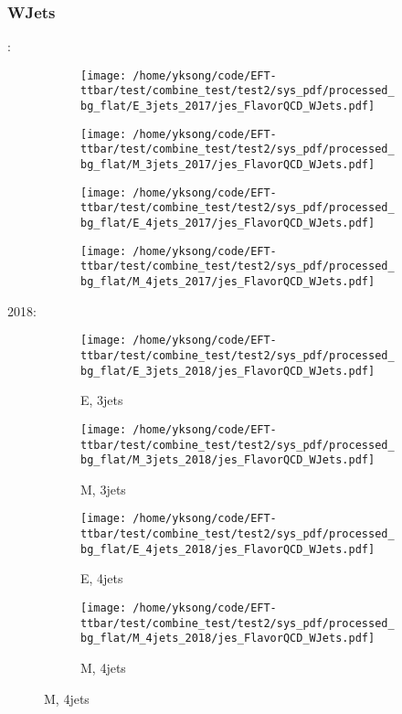 \documentclass{beamer}
\begin{document}
\begin{frame}
\frametitle{WJets}
\fontsize{5}{1}:
\begin{figure}
\centering
\begin{subfigure}[b]{0.24\textwidth}
\texttt{[image: /home/yksong/code/EFT-ttbar/test/combine\_test/test2/sys\_pdf/processed\_bg\_flat/E\_3jets\_2017/jes\_FlavorQCD\_WJets.pdf]}
\end{subfigure}
\begin{subfigure}[b]{0.24\textwidth}
\texttt{[image: /home/yksong/code/EFT-ttbar/test/combine\_test/test2/sys\_pdf/processed\_bg\_flat/M\_3jets\_2017/jes\_FlavorQCD\_WJets.pdf]}
\end{subfigure}
\begin{subfigure}[b]{0.24\textwidth}
\texttt{[image: /home/yksong/code/EFT-ttbar/test/combine\_test/test2/sys\_pdf/processed\_bg\_flat/E\_4jets\_2017/jes\_FlavorQCD\_WJets.pdf]}
\end{subfigure}
\begin{subfigure}[b]{0.24\textwidth}
\texttt{[image: /home/yksong/code/EFT-ttbar/test/combine\_test/test2/sys\_pdf/processed\_bg\_flat/M\_4jets\_2017/jes\_FlavorQCD\_WJets.pdf]}
\end{subfigure}
\end{figure}
2018:
\begin{figure}
\centering
\begin{subfigure}[b]{0.24\textwidth}
\texttt{[image: /home/yksong/code/EFT-ttbar/test/combine\_test/test2/sys\_pdf/processed\_bg\_flat/E\_3jets\_2018/jes\_FlavorQCD\_WJets.pdf]}
\captionsetup{font=tiny}
\caption{E, 3jets}
\end{subfigure}
\begin{subfigure}[b]{0.24\textwidth}
\texttt{[image: /home/yksong/code/EFT-ttbar/test/combine\_test/test2/sys\_pdf/processed\_bg\_flat/M\_3jets\_2018/jes\_FlavorQCD\_WJets.pdf]}
\captionsetup{font=tiny}
\caption{M, 3jets}
\end{subfigure}
\begin{subfigure}[b]{0.24\textwidth}
\texttt{[image: /home/yksong/code/EFT-ttbar/test/combine\_test/test2/sys\_pdf/processed\_bg\_flat/E\_4jets\_2018/jes\_FlavorQCD\_WJets.pdf]}
\captionsetup{font=tiny}
\caption{E, 4jets}
\end{subfigure}
\begin{subfigure}[b]{0.24\textwidth}
\texttt{[image: /home/yksong/code/EFT-ttbar/test/combine\_test/test2/sys\_pdf/processed\_bg\_flat/M\_4jets\_2018/jes\_FlavorQCD\_WJets.pdf]}
\captionsetup{font=tiny}
\caption{M, 4jets}
\end{subfigure}
\end{figure}
\end{frame}
\end{document}
